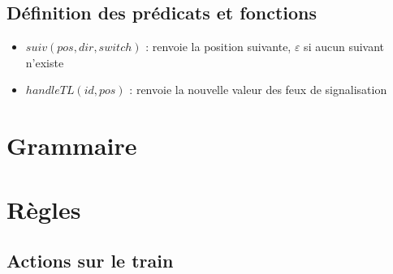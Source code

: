 \documentclass[12pt]{article}
\begin{document}
\subsection{Définition des prédicats et fonctions}

\begin{itemize}
    \item $suiv(pos, dir, switch)$ : renvoie la position suivante, $\varepsilon$ si aucun suivant n'existe
    \item $handleTL(id, pos)$ : renvoie la nouvelle valeur des feux de signalisation
\end{itemize}


\section{Grammaire}



\begin{grammar}
    \otherform{\varepsilon }{}
\end{grammar}

\vspace{0.5cm}

\begin{grammar}
    \otherform{\varepsilon}{}

\end{grammar}






\newpage
\section{Règles}

\subsection{Actions sur le train}
\end{document}
